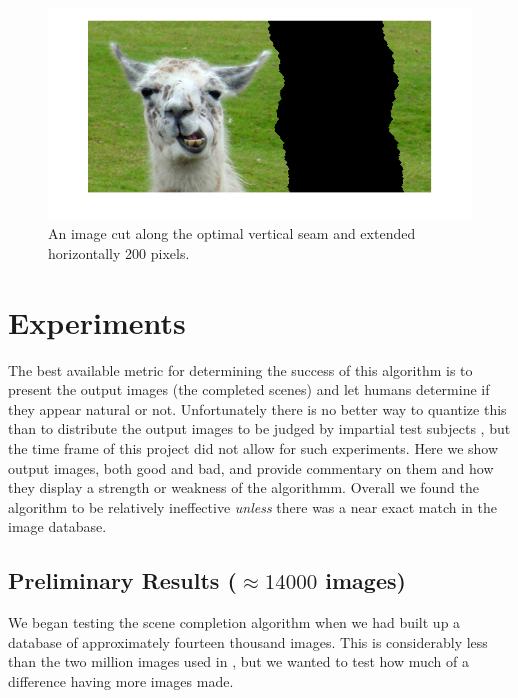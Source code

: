 \documentclass[11pt]{amsart}
\begin{document}
\begin{figure}[htbp]
\begin{center}
\includegraphics[scale=.45]{broken.png}
\caption{An image cut along the optimal vertical seam and extended horizontally 200 pixels.}
\label{llamaCut}
\end{center}
\end{figure}


\section{Experiments}

The best available metric for determining the success of this algorithm is to present the output images (the completed scenes) and let humans determine if they appear natural or not. Unfortunately there is no better way to quantize this than to distribute the output images to be judged by impartial test subjects \cite{Hays:2007}, but the time frame of this project did not allow for such experiments. Here we show output images, both good and bad, and provide commentary on them and how they display a strength or weakness of the algorithmm. Overall we found the algorithm to be relatively ineffective \emph{unless} there was a near exact match in the image database.

\subsection{Preliminary Results ($\approx14000$ images)}

We began testing the scene completion algorithm when we had built up a database of approximately fourteen thousand images. This is considerably less than the two million images used in \cite{Hays:2007}, but we wanted to test how much of a difference having more images made.
\end{document}
